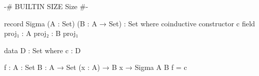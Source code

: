 \documentclass{article}
\begin{document}
\begin{code}
{-# BUILTIN SIZE Size #-}

record Sigma (A : Set) (B : A → Set) : Set where
  coinductive
  constructor c
  field
    proj₁ : A
    proj₂ : B proj₁

data D : Set where
  c : D

f : {A : Set} {B : A → Set} (x : A) → B x → Sigma A B
f = c
\end{code}
\end{document}
